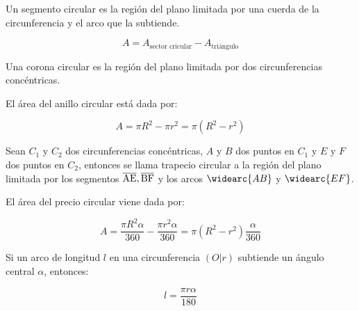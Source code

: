 \begin{definition}
    Un segmento circular es la región del plano limitada por una cuerda de la circunferencia y el arco que la subtiende.

    $$A =  A_{\text{sector cricular}} - A_{\text{triángulo}}$$
\end{definition}

\begin{definition}
    Una corona circular es la región del plano limitada por dos circunferencias concéntricas.

    \begin{figure}[!h]
        \centering
        
        \label{fig:circular-crown}
    \end{figure}

    El área del anillo circular está dada por:

    $$A = \pi R^2 - \pi r^2 = \pi(R^2-r^2)$$
    
\end{definition}

\begin{definition}
    Sean $C_1$ y $C_2$ dos circunferencias concéntricas, $A$ y $B$ dos puntos en $C_1$ y $E$ y $F$ dos puntos en $C_2$, entonces se llama trapecio circular a la región del plano limitada por los segmentos $\overline{\rm AE},\overline{\rm BF}$ y los arcos $\widearc{AB}$ y $\widearc{EF}$.

    El área del precio circular viene dada por:

    $$
    A = \dfrac{\pi R^2 \alpha}{360} - \dfrac{\pi r^2 \alpha}{360} = \pi(R^2 - r^2)\dfrac{\alpha}{360}
    $$
\end{definition}

\begin{theorem}
    Si un arco de longitud $l$ en una circunferencia $(O|r)$ subtiende un ángulo central $\alpha$, entonces:

    $$l = \dfrac{\pi r \alpha}{180}$$
\end{theorem}